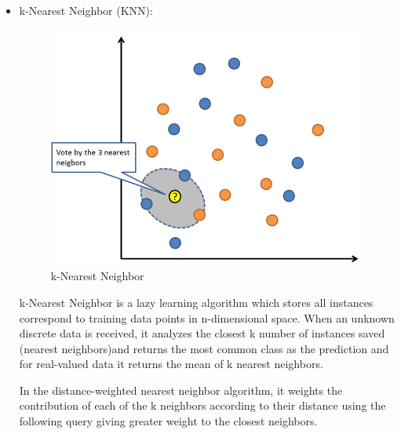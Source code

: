 \begin{itemize}
\begin{itemize}
        \item k-Nearest Neighbor (KNN):
                \begin{figure}[htbp]
                    \centering
	                \includegraphics[scale=0.3]{Figures/knn.png}
                    \caption[k-Nearest Neighbor]{k-Nearest Neighbor}
	                \label{fig:Naive Bayes}
                \end{figure}
        
                k-Nearest Neighbor is a lazy learning algorithm which stores all instances correspond to training data points in n-dimensional space. When an unknown discrete data is received, it analyzes the closest k number of instances saved (nearest neighbors)and returns the most common class as the prediction and for real-valued data it returns the mean of k nearest neighbors.

                In the distance-weighted nearest neighbor algorithm, it weights the contribution of each of the k neighbors according to their distance using the following query giving greater weight to the closest neighbors.


\end{itemize}
\end{itemize}
